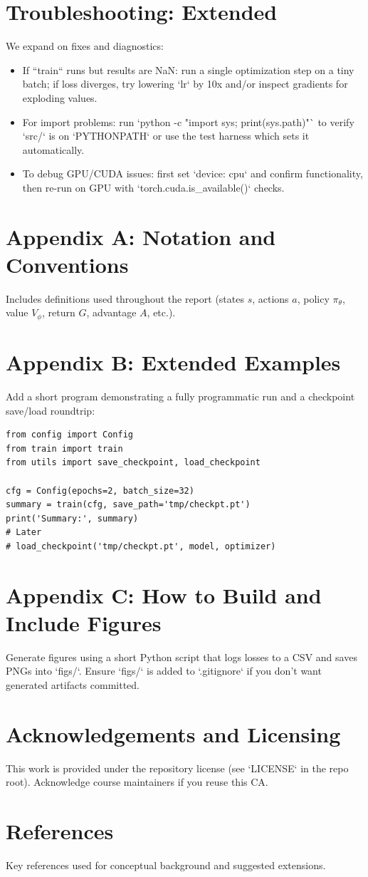 \documentclass[11pt,a4paper]{article}
\begin{document}
\section{Troubleshooting: Extended}
We expand on fixes and diagnostics:
\begin{itemize}
  \item If ``train`` runs but results are NaN: run a single optimization step on a tiny batch; if loss diverges, try lowering `lr` by 10x and/or inspect gradients for exploding values.
  \item For import problems: run `python -c "import sys; print(sys.path)"` to verify `src/` is on `PYTHONPATH` or use the test harness which sets it automatically.
  \item To debug GPU/CUDA issues: first set `device: cpu` and confirm functionality, then re-run on GPU with `torch.cuda.is_available()` checks.
\end{itemize}

\section{Appendix A: Notation and Conventions}
Includes definitions used throughout the report (states $s$, actions $a$, policy $\pi_\theta$, value $V_\phi$, return $G$, advantage $A$, etc.).

\section{Appendix B: Extended Examples}
Add a short program demonstrating a fully programmatic run and a checkpoint save/load roundtrip:
\begin{lstlisting}
from config import Config
from train import train
from utils import save_checkpoint, load_checkpoint

cfg = Config(epochs=2, batch_size=32)
summary = train(cfg, save_path='tmp/checkpt.pt')
print('Summary:', summary)
# Later
# load_checkpoint('tmp/checkpt.pt', model, optimizer)
\end{lstlisting}

\section{Appendix C: How to Build and Include Figures}
Generate figures using a short Python script that logs losses to a CSV and saves PNGs into `figs/`. Ensure `figs/` is added to `.gitignore` if you don't want generated artifacts committed.

\section{Acknowledgements and Licensing}
This work is provided under the repository license (see `LICENSE` in the repo root). Acknowledge course maintainers if you reuse this CA.

\section{References}
Key references used for conceptual background and suggested extensions.



\end{document}
